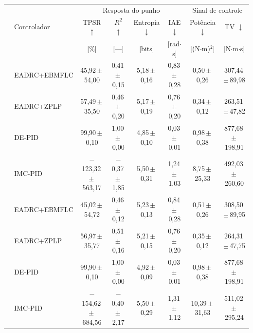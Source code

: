 \begin{adjustbox}{max width=\textwidth}
\scriptsize
\setlength{\tabcolsep}{4pt}
\renewcommand{\arraystretch}{1.15}
\newcommand{\meanstd}[2]{#1\,{\fontsize{7}{8}\selectfont$\pm$\,#2}}
\begin{tabular}{>{\cellcolor{white}}c l c c c c c c}
    \toprule
    & &
    \multicolumn{4}{c}{Resposta do punho} &
    \multicolumn{2}{c}{Sinal de controle} \\
    \cmidrule(lr){3-6} \cmidrule(lr){7-8}
    & Controlador &
    TPSR $\uparrow$ & $R^2$ $\uparrow$ & Entropia $\downarrow$ & IAE $\downarrow$ & Potência $\downarrow$ & TV $\downarrow$ \\
    & &
    [\%] & [---] & [bits] & [rad$\cdot$s] & [(N$\cdot$m)$^2$] & [N$\cdot$m$\cdot$s] \\
    \midrule
    & EADRC+EBMFLC & \meanstd{45,92}{54,00} & \meanstd{0,41}{0,15} & \meanstd{5,18}{0,16} & \meanstd{0,83}{0,28} & \meanstd{0,50}{0,26} & \meanstd{307,44}{89,98} \\
    \rowcolor{CBALightPurple}
    & EADRC+ZPLP & \meanstd{57,49}{35,50} & \meanstd{0,46}{0,20} & \meanstd{5,17}{0,19} & \meanstd{0,76}{0,20} & \meanstd{0,34}{0,12} & \meanstd{263,51}{47,82} \\
    & DE-PID & \meanstd{99,90}{0,10} & \meanstd{1,00}{0,00} & \meanstd{4,85}{0,10} & \meanstd{0,03}{0,01} & \meanstd{0,98}{0,38} & \meanstd{877,68}{198,91} \\
    \multirow{-4}{*}{\rotatebox{90}{Repouso}}
    & IMC-PID & \meanstd{$-$123,32}{563,17} & \meanstd{$-$0,37}{1,85} & \meanstd{5,50}{0,31} & \meanstd{1,24}{1,03} & \meanstd{8,75}{25,33} & \meanstd{492,03}{260,60} \\
    \midrule
    & EADRC+EBMFLC & \meanstd{45,02}{54,72} & \meanstd{0,46}{0,12} & \meanstd{5,23}{0,13} & \meanstd{0,84}{0,28} & \meanstd{0,51}{0,26} & \meanstd{308,50}{89,95} \\
    \rowcolor{CBALightPurple}
    & EADRC+ZPLP & \meanstd{56,97}{35,77} & \meanstd{0,51}{0,16} & \meanstd{5,21}{0,15} & \meanstd{0,76}{0,20} & \meanstd{0,35}{0,12} & \meanstd{264,31}{47,75} \\
    & DE-PID & \meanstd{99,90}{0,10} & \meanstd{1,00}{0,00} & \meanstd{4,92}{0,09} & \meanstd{0,03}{0,01} & \meanstd{0,98}{0,38} & \meanstd{877,68}{198,91} \\
    \multirow{-4}{*}{\rotatebox{90}{Movimento}}
    & IMC-PID & \meanstd{$-$154,62}{684,56} & \meanstd{$-$0,40}{2,17} & \meanstd{5,50}{0,29} & \meanstd{1,31}{1,12} & \meanstd{10,39}{31,63} & \meanstd{511,02}{295,24} \\
    \bottomrule
\end{tabular}
\end{adjustbox}
